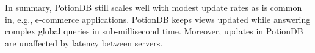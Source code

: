 \documentclass[sigplan,review,anonymous]{acmart}
\begin{document}
In summary, PotionDB still scales well with modest update rates as is common in, e.g., e-commerce applications.
PotionDB keeps views updated while answering complex global queries in sub-millisecond time.
Moreover, updates in PotionDB are unaffected by latency between servers.


%
%
%
%
%
%
\end{document}
